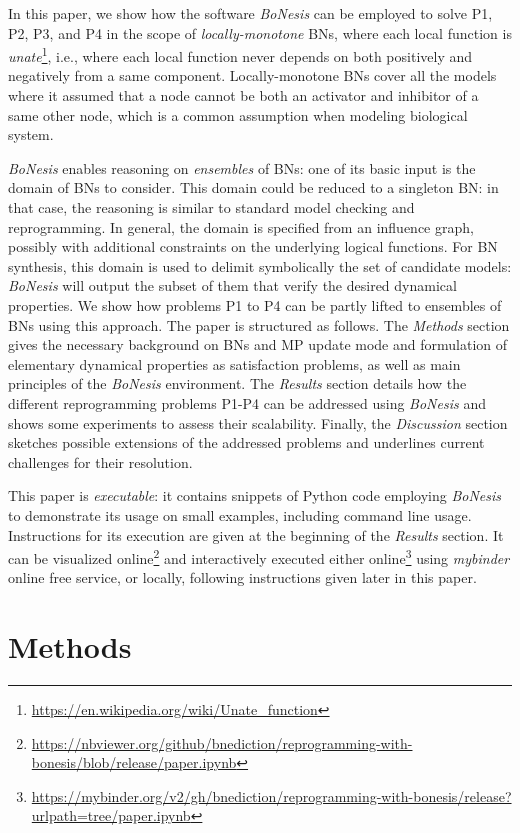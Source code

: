 \documentclass[PCJ,Unicode,screen,mode=plain]{cedram}
\begin{document}
In this paper, we show how the software \emph{BoNesis} can be employed
to solve P1, P2, P3, and P4 in the scope of \emph{locally-monotone} BNs,
where each local function is
\emph{{unate}}\footnote{\url{https://en.wikipedia.org/wiki/Unate_function}}, i.e.,
where each local function never depends on both positively and
negatively from a same component. Locally-monotone BNs cover all the
models where it assumed that a node cannot be both an activator and
inhibitor of a same other node, which is a common assumption when
modeling biological system.

\emph{BoNesis} enables reasoning on \emph{ensembles} of BNs: one of its
basic input is the domain of BNs to consider. This domain could be
reduced to a singleton BN: in that case, the reasoning is similar to
standard model checking and reprogramming. In general, the domain is
specified from an influence graph, possibly with additional constraints
on the underlying logical functions. For BN synthesis, this domain is
used to delimit symbolically the set of candidate models: \emph{BoNesis}
will output the subset of them that verify the desired dynamical
properties. We show how problems P1 to P4 can be partly lifted to
ensembles of BNs using this approach.
The paper is structured as follows. The \emph{Methods} section gives the
necessary background on BNs and MP update mode and formulation of
elementary dynamical properties as satisfaction problems, as well as
main principles of the \emph{BoNesis} environment. The \emph{Results}
section details how the different reprogramming problems P1-P4 can be
addressed using \emph{BoNesis} and shows some experiments to assess
their scalability. Finally, the \emph{Discussion} section sketches
possible extensions of the addressed problems and underlines current
challenges for their resolution.

This paper is \emph{executable}: it contains snippets of Python code
employing \emph{BoNesis} to demonstrate its usage on small examples,
including command line usage. Instructions for its execution are given
at the beginning of the \emph{Results} section. It can be visualized
online\footnote{\url{https://nbviewer.org/github/bnediction/reprogramming-with-bonesis/blob/release/paper.ipynb}}
and interactively executed either online\footnote{%
\url{https://mybinder.org/v2/gh/bnediction/reprogramming-with-bonesis/release?urlpath=tree/paper.ipynb}}
using \emph{mybinder} online free service, or
locally, following instructions given later in this paper.
\hypertarget{methods}{%
\section{Methods}\label{methods}}
\end{document}
